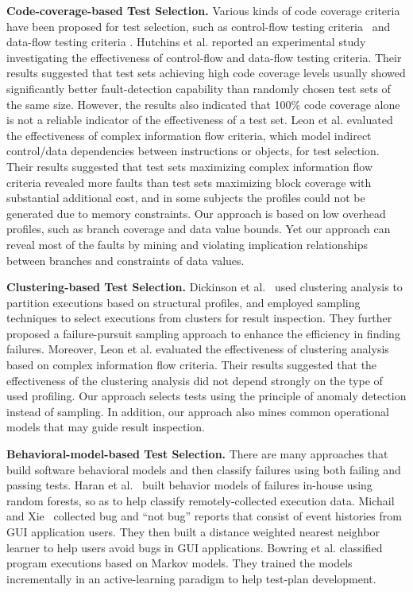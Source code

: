 \documentclass{sig-alternate}
\begin{document}
\textbf{Code-coverage-based Test Selection.} Various kinds of code
coverage criteria have been proposed for test selection, such as
control-flow testing criteria~\cite{Huang75} and data-flow testing
criteria \cite{Frankl88}. Hutchins et al. \cite{Hutchins94} reported
an experimental study investigating the effectiveness of
control-flow and data-flow testing criteria. Their results suggested
that test sets achieving high code coverage levels usually showed
significantly better fault-detection capability than randomly chosen
test sets of the same size. However, the results also indicated that
100\% code coverage alone is not a reliable indicator of the
effectiveness of a test set. Leon et al. \cite{Leon05} evaluated the
effectiveness of complex information flow criteria, which model
indirect control/data dependencies between instructions or objects,
for test selection. Their results suggested that test sets
maximizing complex information flow criteria revealed more faults
than test sets maximizing block coverage with substantial additional
cost, and in some subjects the profiles could not be generated due
to memory constraints. Our approach is based on low overhead
profiles, such as branch coverage and data value bounds. Yet our
approach can reveal most of the faults by mining and violating
implication relationships between branches and constraints of data
values.

\textbf{Clustering-based Test Selection.} Dickinson et
al.~\cite{Dickinson01a} used clustering analysis to partition
executions based on structural profiles, and employed sampling
techniques to select executions from clusters for result inspection.
They further proposed a failure-pursuit sampling approach
\cite{Dickinson01b} to enhance the efficiency in finding failures.
Moreover, Leon et al. \cite{Leon05} evaluated the effectiveness of
clustering analysis based on complex information flow criteria.
Their results suggested that the effectiveness of the clustering
analysis did not depend strongly on the type of used profiling. Our
approach selects tests using the principle of anomaly detection
instead of sampling. In addition, our approach also mines common
operational models that may guide result inspection.

\textbf{Behavioral-model-based Test Selection.} There are many
approaches that build software behavioral models and then classify
failures using both failing and passing tests. Haran et
al.~\cite{Haran05} built behavior models of failures in-house using
random forests, so as to help classify remotely-collected execution
data. Michail and Xie~\cite{Michail05} collected bug and ``not bug''
reports that consist of event histories from GUI application users.
They then built a distance weighted nearest neighbor learner to help
users avoid bugs in GUI applications. Bowring et al.
\cite{Bowring04} classified program executions based on Markov
models. They trained the models incrementally in an active-learning
paradigm to help test-plan development.
\end{document}
